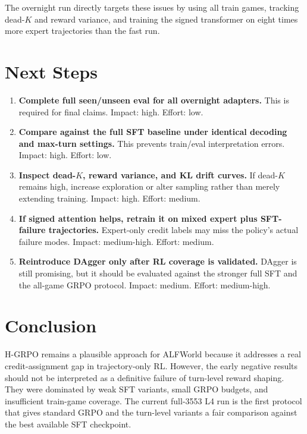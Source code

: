 \documentclass[10pt]{article}
\begin{document}
The overnight run directly targets these issues by using all train games, tracking dead-\(K\) and reward variance, and training the signed transformer on eight times more expert trajectories than the fast run.

\section{Next Steps}
\begin{enumerate}
    \item \textbf{Complete full seen/unseen eval for all overnight adapters.} This is required for final claims. Impact: high. Effort: low.
    \item \textbf{Compare against the full SFT baseline under identical decoding and max-turn settings.} This prevents train/eval interpretation errors. Impact: high. Effort: low.
    \item \textbf{Inspect dead-\(K\), reward variance, and KL drift curves.} If dead-\(K\) remains high, increase exploration or alter sampling rather than merely extending training. Impact: high. Effort: medium.
    \item \textbf{If signed attention helps, retrain it on mixed expert plus SFT-failure trajectories.} Expert-only credit labels may miss the policy's actual failure modes. Impact: medium-high. Effort: medium.
    \item \textbf{Reintroduce DAgger only after RL coverage is validated.} DAgger is still promising, but it should be evaluated against the stronger full SFT and the all-game GRPO protocol. Impact: medium. Effort: medium-high.
\end{enumerate}

\section{Conclusion}
H-GRPO remains a plausible approach for ALFWorld because it addresses a real credit-assignment gap in trajectory-only RL. However, the early negative results should not be interpreted as a definitive failure of turn-level reward shaping. They were dominated by weak SFT variants, small GRPO budgets, and insufficient train-game coverage. The current full-3553 L4 run is the first protocol that gives standard GRPO and the turn-level variants a fair comparison against the best available SFT checkpoint.
\end{document}
